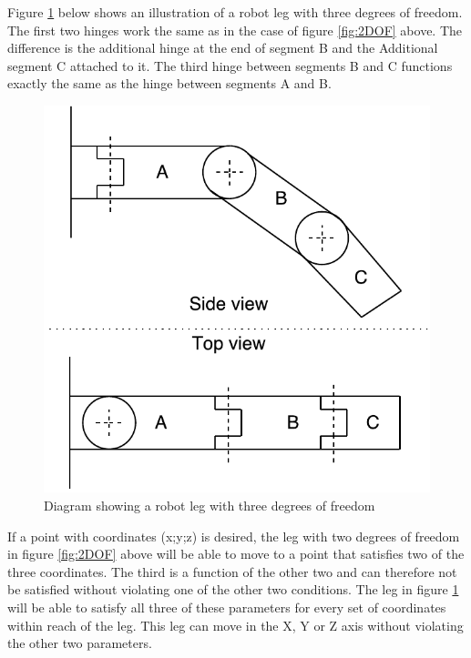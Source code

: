 Figure \ref{fig:3DOF} below shows an illustration of a robot leg with three degrees of freedom. The first two hinges work the same as in the case of figure \ref{fig:2DOF} above. The difference is the additional hinge at the end of segment B and the Additional segment C attached to it. The third hinge between segments B and C functions exactly the same as the hinge between segments A and B.

\FloatBarrier
\begin{figure}[H]
    \centering
        \includegraphics[scale=0.8]{pics/EPR400-3DOF.pdf}
    \caption{Diagram showing a robot leg with three degrees of freedom}
    \label{fig:3DOF}
\end{figure}
\FloatBarrier

If a point with coordinates (x;y;z) is desired, the leg with two degrees of freedom in figure \ref{fig:2DOF} above will be able to move to a point that satisfies two of the three coordinates. The third is a function of the other two and can therefore not be satisfied without violating one of the other two conditions. The leg in figure \ref{fig:3DOF} will be able to satisfy all three of these parameters for every set of coordinates within reach of the leg. This leg can move in the X, Y or Z axis without violating the other two parameters.\\

